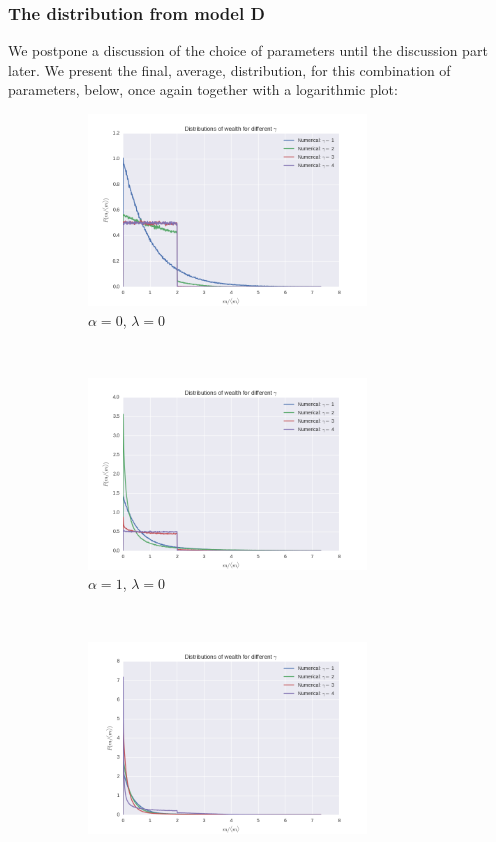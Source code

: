 \documentclass[a4paper, 10pt]{article}
\begin{document}
\subsubsection{The distribution from model D}
We postpone a discussion of the choice of parameters until the discussion part later. We present the final, average, distribution, for this combination of parameters, below, once again together with a logarithmic plot:
\begin{figure}[!hb] %
	\centering
    \begin{subfigure}[H!]{0.5\textwidth}
    	\centering
    	\includegraphics[height=2.0in]{distGammasA0.png}
    	\caption{$\alpha = 0$, $\lambda=0$}\label{fig:ModelD_dist_1}
    \end{subfigure}%
    ~
    \begin{subfigure}[H!]{0.5\textwidth}
        \centering
        \includegraphics[height=2.0in]{distGammasA1.png} %
        \caption{$\alpha = 1$, $\lambda=0$}\label{fig:ModelD_dist_2}
    \end{subfigure}
    ~ 
     \begin{subfigure}[H!]{0.5\textwidth}
        \centering
        \includegraphics[height=2.0in]{distGammasA2.png}

\end{subfigure}
\end{figure}
\end{document}
